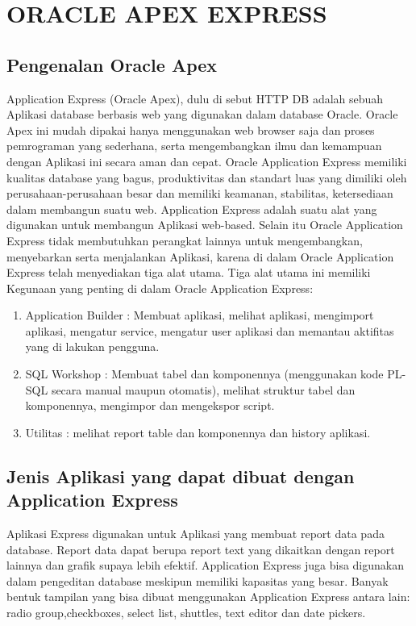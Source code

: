 \chapter{ORACLE APEX EXPRESS}

\section{Pengenalan Oracle Apex}
Application Express (Oracle Apex), dulu di sebut HTTP DB adalah sebuah Aplikasi database berbasis web yang digunakan dalam database Oracle. Oracle Apex ini mudah dipakai hanya menggunakan web browser saja dan proses pemrograman yang sederhana, serta mengembangkan ilmu dan kemampuan dengan Aplikasi ini secara aman dan cepat. Oracle Application Express memiliki kualitas database yang bagus, produktivitas dan standart luas yang dimiliki oleh perusahaan-perusahaan besar dan memiliki keamanan, stabilitas, ketersediaan dalam membangun suatu web. Application Express adalah suatu alat yang digunakan untuk membangun Aplikasi web-based. Selain itu Oracle Application Express tidak membutuhkan perangkat lainnya untuk mengembangkan, menyebarkan serta menjalankan Aplikasi, karena di dalam Oracle Application Express telah menyediakan tiga alat utama. Tiga alat utama ini memiliki Kegunaan yang penting di dalam Oracle Application Express:
\begin{enumerate}
    \item Application Builder : Membuat aplikasi, melihat aplikasi, mengimport aplikasi, mengatur service, mengatur user aplikasi dan memantau aktifitas yang di lakukan pengguna.
    \item SQL Workshop : Membuat tabel dan komponennya (menggunakan kode PL-SQL secara manual maupun otomatis), melihat struktur tabel dan komponennya, mengimpor dan mengekspor script.
    \item Utilitas : melihat report table dan komponennya dan history aplikasi.
\end{enumerate}
\section{Jenis Aplikasi yang dapat dibuat dengan Application Express}
Aplikasi Express digunakan untuk Aplikasi yang membuat report data pada database. Report data dapat berupa report text yang dikaitkan dengan report lainnya dan grafik supaya lebih efektif. Application Express juga bisa digunakan dalam pengeditan database meskipun memiliki kapasitas yang besar. Banyak bentuk tampilan yang bisa dibuat menggunakan Application Express antara lain: radio group,checkboxes, select list, shuttles, text editor dan date pickers. 
